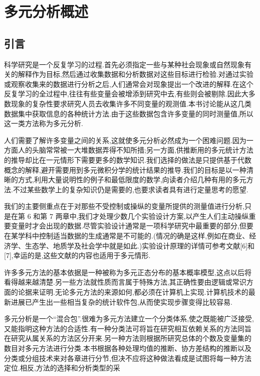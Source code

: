 \chapter{多元分析概述}
\label{chap:1}

\section{引言}
\label{sec:1.1}

科学研究是一个反复学习的过程.首先必须指定一些与某种社会现象或自然现象有关的解释作为目标,然后通过收集数据和分析数据对这些目标进行检验.对通过实验或观察收集来的数据进行分析之后,人们通常会对现象提出一个改进的解释.在这个反复学习的全过程中,往往有些变量会被增添到研究中去,有些则会被剔除.因此大多数现象的复杂性要求研究人员去收集许多不同变量的观测值.本书讨论能从这几类数据集中获取信息的各种统计方法.由于这些数据包含许多变量的同时测量值,所以这一类方法称为多元分析.

人们需要了解许多变量之间的关系,这就使多元分析必然成为一个困难问题.因为一方面人的头脑常常被一大堆数据弄得不知所措;另一方面,供推断用的多元统计方法的推导却比在一元情形下需要更多的数学知识.我们选择的做法是只提供基于代数概念的解释,避开需要用到多元微积分学的统计结果的推导.我们的目标是以一种清晰的方式,利用大量说明性的例子和最低限度的数学,向读者介绍几种有用的多元方法.不过某些数学上的复杂知识仍是需要的,也要求读者具有进行定量思考的愿望.

我们的主要侧重点在于对那些不受控制或操纵的变量所提供的测量值进行分析,只是在第 6 和第 7 两章中,我们才处理少数几个实验设计方案,以产生人们主动操纵重要变量时才会出现的数据.尽管实验设计通常是一项科学研究中最重要的部分,但要在某学科中控制适当数据的生成通常是不可能的.(情况的确是这样,例如在商业、经济学、生态学、地质学及社会学中就是如此.)实验设计原理的详情可参考文献[6]和[7],幸运的是,这些文献的内容也适用于多元情形.

许多多元方法的基本依据是一种被称为多元正态分布的基本概率模型,这点以后将看得越来越清楚.另一些方法就性质而言属于特殊方法,其正确性要由逻辑或常识方面的论据来证明.无论多元方法的来源如何,都必须在计算机上实现.计算机技术的最新进展已产生出一些相当复杂的统计软件包,从而使实现步骤变得比较容易.

多元分析是一个“混合包”.很难为多元方法建立一个分类体系,使之既能被广泛接受,又能指明这种方法的合适性.有一种分类法可将旨在研究相互依赖关系的方法同旨在研究从属关系的方法区分开来.另一种方法则根据所研究总体的个数及变量集的数目对多元方法进行分类.本书根据各种处理均值的推断、协方差结构的推断以及分类或分组技术来对各章进行分节,但决不应将这种做法看成是试图将每一种方法定位.相反,方法的选择和分析类型的采%
